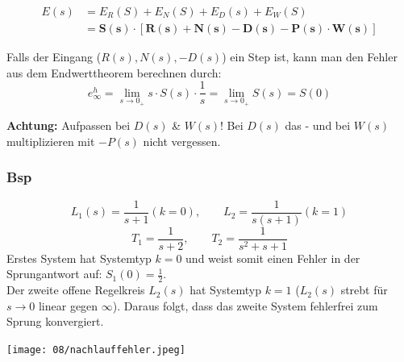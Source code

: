         \begin{align*}
            E(s) &= E_R(S) + E_N(S) + E_D(s) + E_W(S)\\
            &= \mathbf{S(s)\cdot \left[R(s) + N(s) - D(s) - P(s)\cdot W(s)\right]}
        \end{align*}
        
        Falls der Eingang ($R(s),N(s),-D(s)$) ein Step ist, kann man den Fehler aus dem Endwerttheorem berechnen durch:
        \[e^h_\infty=\lim_{s\to 0_+}s\cdot S(s)\cdot\frac{1}{s}=\lim_{s\to 0_+}S(s)=S(0)\]
        
        \textbf{Achtung:} Aufpassen bei $D(s)$ \& $W(s)$! Bei $D(s)$ das - und bei $W(s)$ multiplizieren mit $-P(s)$ nicht vergessen.
        
        \subsubsection{Bsp}
            \[L_1(s) =\frac{1}{s+1}(k=0),\qquad L_2 =\frac{1}{s(s+1)}(k=1)\]
            \[T_1 =\frac{1}{s+2},\qquad T_2 =\frac{1}{s^2+s+1}\]
            Erstes System hat Systemtyp $k=0$ und weist somit einen Fehler in der Sprungantwort auf: $S_1(0)=\frac{1}{2}$.\\
            Der zweite offene Regelkreis $L_2(s)$ hat Systemtyp $k=1$ ($L_2(s)$ strebt für $s\to 0$ linear gegen $\infty$). Daraus folgt, dass das zweite System fehlerfrei zum Sprung konvergiert.
            \begin{center}
                \texttt{[image: 08/nachlauffehler.jpeg]}
            \end{center}

    
    
